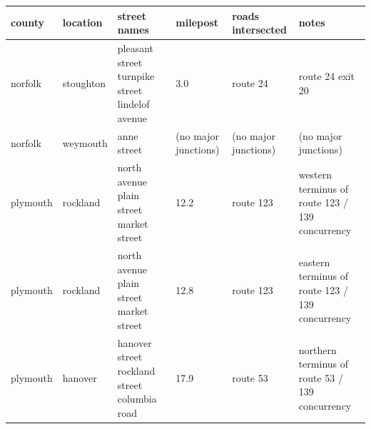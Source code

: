 \documentclass{article}
\begin{document}
\begin{tabular}{llllll}
\toprule
county & location & street names & milepost & roads intersected & notes \\
\midrule
norfolk & stoughton & pleasant street turnpike street lindelof avenue & 3.0 & route 24 & route 24 exit 20 \\
norfolk & weymouth & anne street & (no major junctions) & (no major junctions) & (no major junctions) \\
plymouth & rockland & north avenue plain street market street & 12.2 & route 123 & western terminus of route 123 / 139 concurrency \\
plymouth & rockland & north avenue plain street market street & 12.8 & route 123 & eastern terminus of route 123 / 139 concurrency \\
plymouth & hanover & hanover street rockland street columbia road & 17.9 & route 53 & northern terminus of route 53 / 139 concurrency \\
\bottomrule
\end{tabular}
\end{document}
